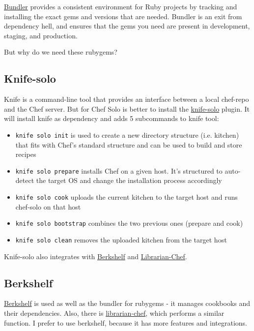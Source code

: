 \href{http://bundler.io/}{Bundler} provides a consistent environment for Ruby projects by tracking and installing the exact gems and versions that are needed. Bundler is an exit from dependency hell, and ensures that the gems you need are present in development, staging, and production.

But why do we need these rubygems?

\subsection{Knife-solo}

Knife is a command-line tool that provides an interface between a local chef-repo and the Chef server. But for Chef Solo is better to install the \href{http://matschaffer.github.io/knife-solo/}{knife-solo} plugin. It will install knife as dependency and adds 5 subcommands to knife tool:

\begin{itemize}
  \item \lstinline!knife solo init! is used to create a new directory structure (i.e. kitchen) that fits with Chef's standard structure and can be used to build and store recipes
  \item \lstinline!knife solo prepare! installs Chef on a given host. It's structured to auto-detect the target OS and change the installation process accordingly
  \item \lstinline!knife solo cook! uploads the current kitchen to the target host and runs chef-solo on that host
  \item \lstinline!knife solo bootstrap! combines the two previous ones (prepare and cook)
  \item \lstinline!knife solo clean! removes the uploaded kitchen from the target host
\end{itemize}

Knife-solo also integrates with \href{http://berkshelf.com/}{Berkshelf} and \href{https://github.com/applicationsonline/librarian-chef}{Librarian-Chef}.

\subsection{Berkshelf}

\href{http://berkshelf.com/}{Berkshelf} is used as well as the bundler for rubygems - it manages cookbooks and their dependencies. Also, there is \href{https://github.com/applicationsonline/librarian-chef}{librarian-chef}, which performs a similar function. I prefer to use berkshelf, because it has more features and integrations.
